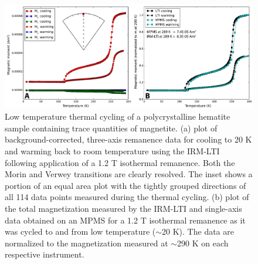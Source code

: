 \documentclass[draft,gc]{AGUTeX}
\begin{document}
\begin{figure}
\noindent\includegraphics[width=\textwidth]{HemMag1.pdf}
\caption{Low temperature thermal cycling of a polycrystalline hematite sample containing trace quantities of magnetite. (a) plot of background-corrected, three-axis remanence data for cooling to 20 K and warming back to room temperature using the IRM-LTI following application of a 1.2 T isothermal remanence. Both the Morin and Verwey transitions are clearly resolved. The inset shows a portion of an equal area plot with the tightly grouped directions of all 114 data points measured during the thermal cycling. (b) plot of the total magnetization measured by the IRM-LTI and single-axis data obtained on an MPMS for a 1.2 T isothermal remanence as it was cycled to and from low temperature ($\sim$20 K). The data are normalized to the magnetization measured at $\sim$290 K on each respective instrument.}
\label{fig:naco}
\end{figure}
\end{document}
